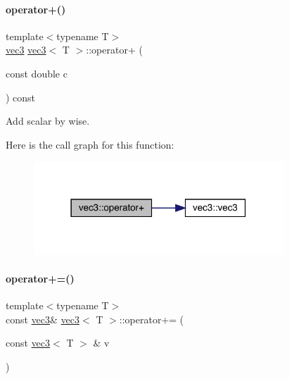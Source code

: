 \paragraph{\texorpdfstring{operator+()}{operator+()}\hspace{0.1cm}{\footnotesize\ttfamily [2/2]}}
{\footnotesize\ttfamily template$<$typename T$>$ \\
\mbox{\hyperlink{structvec3}{vec3}} \mbox{\hyperlink{structvec3}{vec3}}$<$ T $>$\+::operator+ (\begin{DoxyParamCaption}\item[{const double}]{c }\end{DoxyParamCaption}) const\hspace{0.3cm}{\ttfamily [inline]}}



Add scalar by wise. 

Here is the call graph for this function\+:\nopagebreak
\begin{figure}[H]
\begin{center}
\leavevmode
\includegraphics[width=266pt]{structvec3_a479dd2445daeeec47e6a5a8e4487f51b_cgraph}
\end{center}
\end{figure}
\mbox{\label{structvec3_a5d12f7aba42eea6253a4ada5ce73b7d8}} 
\paragraph{\texorpdfstring{operator+=()}{operator+=()}\hspace{0.1cm}{\footnotesize\ttfamily [1/2]}}
{\footnotesize\ttfamily template$<$typename T$>$ \\
const \mbox{\hyperlink{structvec3}{vec3}}\& \mbox{\hyperlink{structvec3}{vec3}}$<$ T $>$\+::operator+= (\begin{DoxyParamCaption}\item[{const \mbox{\hyperlink{structvec3}{vec3}}$<$ T $>$ \&}]{v }\end{DoxyParamCaption})\hspace{0.3cm}{\ttfamily [inline]}}

